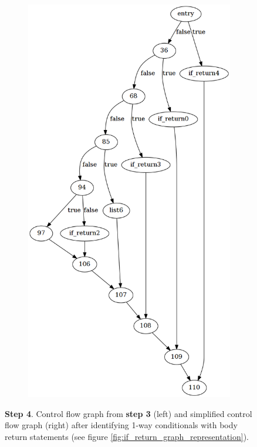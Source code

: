 \begin{figure}[htbp]
\begin{subfigure}[t]{0.45\textwidth}
		\includegraphics[width=\textwidth]{appendices/stmt_example/stmt_4.png}
	\end{subfigure}
	\caption{\textbf{Step 4}. Control flow graph from \textbf{step 3} (left) and simplified control flow graph (right) after identifying 1-way conditionals with body return statements (see figure \ref{fig:if_return_graph_representation}).}
	\label{fig:step_4}
\end{figure}

